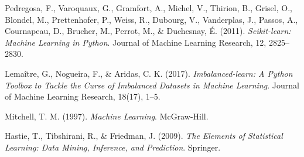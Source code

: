 \documentclass[11pt,a4paper]{article}
\begin{document}
\begin{thebibliography}{9}

Pedregosa, F., Varoquaux, G., Gramfort, A., Michel, V., Thirion, B., Grisel, O., Blondel, M., Prettenhofer, P., Weiss, R., Dubourg, V., Vanderplas, J., Passos, A., Cournapeau, D., Brucher, M., Perrot, M., \& Duchesnay, É. (2011).
\textit{Scikit-learn: Machine Learning in Python}.
Journal of Machine Learning Research, 12, 2825–2830.

Lemaître, G., Nogueira, F., \& Aridas, C. K. (2017).
\textit{Imbalanced-learn: A Python Toolbox to Tackle the Curse of Imbalanced Datasets in Machine Learning}.
Journal of Machine Learning Research, 18(17), 1–5.

Mitchell, T. M. (1997).
\textit{Machine Learning}.
McGraw-Hill.

Hastie, T., Tibshirani, R., \& Friedman, J. (2009).
\textit{The Elements of Statistical Learning: Data Mining, Inference, and Prediction}.
Springer.

\end{thebibliography}
\end{document}
